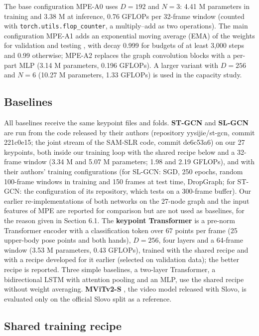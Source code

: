 \documentclass[a4paper,fleqn]{cas-dc}
\begin{document}
The base configuration MPE-A0 uses \(D = 192\) and \(N = 3\): 4.41 M parameters in training and 3.38 M at inference, 0.76 GFLOPs per 32-frame window (counted with \texttt{torch.utils.flop\_counter}, a multiply--add as two operations). The main configuration MPE-A1 adds an exponential moving average (EMA) of the weights for validation and testing \cite{1992_polyak_averaging}, with decay 0.999 for budgets of at least 3,000 steps and 0.99 otherwise; MPE-A2 replaces the graph convolution blocks with a per-part MLP (3.14 M parameters, 0.196 GFLOPs). A larger variant with \(D = 256\) and \(N = 6\) (10.27 M parameters, 1.33 GFLOPs) is used in the capacity study.

\hypertarget{baselines}{%
\subsection{Baselines}\label{baselines}}

All baselines receive the same keypoint files and folds. \textbf{ST-GCN} \cite{2018_yan_stgcn} and \textbf{SL-GCN} \cite{2021_jiang_sam_slr} are run from the code released by their authors (repository yysijie/st-gcn, commit 221c0e15; the joint stream of the SAM-SLR code, commit de6c53a6) on our 27 keypoints, both inside our training loop with the shared recipe below and a 32-frame window (3.34 M and 5.07 M parameters; 1.98 and 2.19 GFLOPs), and with their authors' training configurations (for SL-GCN: SGD, 250 epochs, random 100-frame windows in training and 150 frames at test time, DropGraph; for ST-GCN: the configuration of its repository, which tests on a 300-frame buffer). Our earlier re-implementations of both networks on the 27-node graph and the input features of MPE are reported for comparison but are not used as baselines, for the reason given in Section 6.1. The \textbf{keypoint Transformer} is a pre-norm Transformer encoder \cite{2017_vaswani_attention} with a classification token over 67 points per frame (25 upper-body pose points and both hands), \(D = 256\), four layers and a 64-frame window (3.53 M parameters, 0.43 GFLOPs), trained with the shared recipe and with a recipe developed for it earlier (selected on validation data); the better recipe is reported. Three simple baselines, a two-layer Transformer, a bidirectional LSTM with attention pooling and an MLP, use the shared recipe without weight averaging. \textbf{MViTv2-S} \cite{2022_li_mvitv2}, the video model released with Slovo, is evaluated only on the official Slovo split as a reference.

\hypertarget{shared-training-recipe}{%
\subsection{Shared training recipe}\label{shared-training-recipe}}
\end{document}
